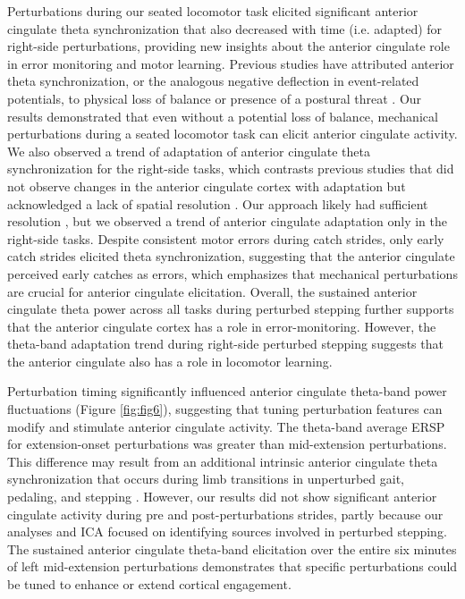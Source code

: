 \documentclass[../thesis_seyed.tex]{subfiles}
\begin{document}
Perturbations during our seated locomotor task elicited significant anterior cingulate theta synchronization that also decreased with time (i.e. adapted) for right-side perturbations, providing new insights about the anterior cingulate role in error monitoring and motor learning. Previous studies have attributed anterior theta synchronization, or the analogous negative deflection in event-related potentials, to physical loss of balance or presence of a postural threat \cite{Adkin2008-fw,Peterson2018-ht}. Our results demonstrated that even without a potential loss of balance, mechanical perturbations during a seated locomotor task can elicit anterior cingulate activity. We also observed {a trend of }adaptation of anterior cingulate theta synchronization for the right-side tasks, which contrasts previous studies that did not observe changes in the anterior cingulate cortex with adaptation but acknowledged a lack of spatial resolution \cite{Haefeli2011-ym,Mierau2015-fd}. Our approach likely had sufficient resolution \cite{Shirazi2019-im, Shirazi2019-ke}, {but we observed a trend of} anterior cingulate adaptation only in the right-side tasks. {Despite consistent motor errors during catch strides, only early catch strides elicited theta synchronization, suggesting that the anterior cingulate perceived early catches as errors, which emphasizes that mechanical perturbations are crucial for anterior cingulate elicitation.} Overall, the sustained anterior cingulate theta power across all tasks during perturbed stepping further supports that the anterior cingulate cortex has a role in error-monitoring. However, {the theta-band adaptation trend} during right-side perturbed stepping suggests that the anterior cingulate also has a role in locomotor learning.


Perturbation timing significantly influenced anterior cingulate theta-band power fluctuations (Figure \ref{fig:fig6}), suggesting that tuning perturbation features can modify and stimulate anterior cingulate activity. The theta-band average ERSP for extension-onset perturbations was greater than mid-extension perturbations. This difference may result from an additional intrinsic anterior cingulate theta synchronization that occurs during limb transitions in unperturbed gait, pedaling, and stepping \cite{Gramann2011-yj,Bulea2015-dv,Kline2016-ci,Enders2016-id}. However, our results did not show significant anterior cingulate activity during pre and post-perturbations strides, partly because our analyses and ICA focused on identifying sources involved in perturbed stepping. The sustained anterior cingulate theta-band elicitation over the entire six minutes of left mid-extension perturbations demonstrates that specific perturbations could be tuned to enhance or extend cortical engagement.
\end{document}
